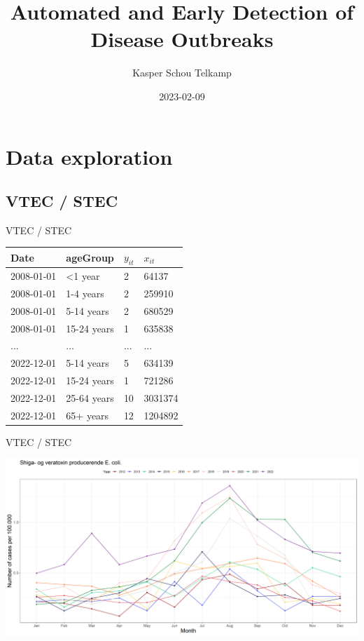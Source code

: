 \documentclass[aspectratio=169]{beamer}
\title[Automated and Early Detection of Disease Outbreaks]{Automated and
Early Detection of Disease Outbreaks}
\author{Kasper Schou Telkamp}
\institute{Section for Dynamical Systems}
\date{2023-02-09}
\begin{document}
\frame{
	\maketitle
}


\hypertarget{data-exploration}{%
\section{Data exploration}\label{data-exploration}}

\hypertarget{vtec-stec}{%
\subsection*{VTEC / STEC}\label{vtec-stec}}

\begin{frame}{VTEC / STEC}
\tiny

\begin{table}
\centering\begingroup\fontsize{12}{14}\selectfont

\begin{tabular}{llll}
\toprule
Date & ageGroup & $y_{it}$ & $x_{it}$\\
\midrule
2008-01-01 & <1 year & 2 & 64137\\
2008-01-01 & 1-4 years & 2 & 259910\\
2008-01-01 & 5-14 years & 2 & 680529\\
2008-01-01 & 15-24 years & 1 & 635838\\
... & ... & ... & ...\\
2022-12-01 & 5-14 years & 5 & 634139\\
2022-12-01 & 15-24 years & 1 & 721286\\
2022-12-01 & 25-64 years & 10 & 3031374\\
2022-12-01 & 65+ years & 12 & 1204892\\
\bottomrule
\end{tabular}
\endgroup{}
\end{table}

\normalsize
\end{frame}

\begin{frame}{VTEC / STEC}
\protect\hypertarget{vtec-stec-1}{}
\tiny

\includegraphics[width=1\linewidth]{../figures/EpixSTEC}

\normalsize
\end{frame}
\end{document}
